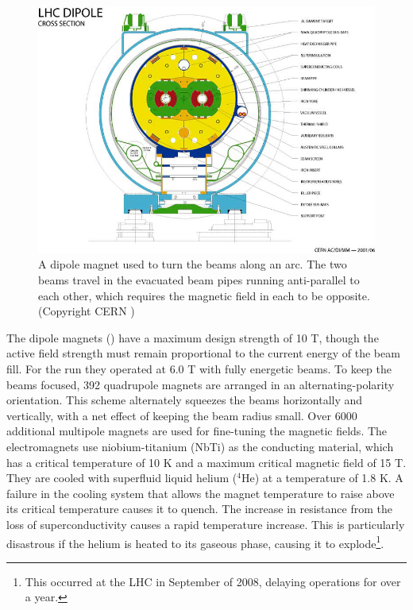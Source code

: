 \begin{figure}[t]
\includegraphics{LHC-PHO-2001-187.jpg}
\caption{A dipole magnet used to turn the beams along an arc. The two beams travel in the evacuated beam pipes running anti-parallel to each other, which requires the magnetic field in each to be opposite. (Copyright CERN \cite{Valeriane:843195})}
\label{fig:dipole_cross_section}
\end{figure}

The dipole magnets () have a maximum design strength of 10 T, though the active field strength must remain proportional to the current energy of the beam fill.
For the \pPbenergy \pPb run they operated at 6.0 T with fully energetic beams.
To keep the beams focused, 392 quadrupole magnets are arranged in an alternating-polarity orientation.
This scheme alternately squeezes the beams horizontally and vertically, with a net effect of keeping the beam radius small.
Over 6000 additional multipole magnets are used for fine-tuning the magnetic fields.
The electromagnets use niobium-titanium (NbTi) as the conducting material, which has a critical temperature of 10 K and a maximum critical magnetic field of 15 T.
They are cooled with superfluid liquid helium (${}^{4}\textrm{He}$) at a temperature of 1.8 K.
A failure in the cooling system that allows the magnet temperature to raise above its critical temperature causes it to quench.
The increase in resistance from the loss of superconductivity causes a rapid temperature increase.
This is particularly disastrous if the helium is heated to its gaseous phase, causing it to explode\footnote{This occurred at the LHC in September of 2008, delaying operations for over a year.}.


